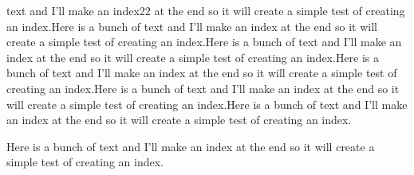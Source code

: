 \documentclass{book}
\begin{document}
text and I'll make an index22 at the end so it will create a simple test of creating an index.Here is a bunch of text and I'll make an index at the end so it will create a simple test of creating an index.Here is a bunch of text and I'll make an index at the end so it will create a simple test of creating an index.Here is a bunch of text and I'll make an index at the end so it will create a simple test of creating an index.Here is a bunch of text and I'll make an index at the end so it will create a simple test of creating an index.Here is a bunch of text and I'll make an index at the end so it will create a simple test of creating an index.

Here is a bunch of text and I'll make an index at the end so it will create a simple test of creating an index.


\printindex
\end{document}
